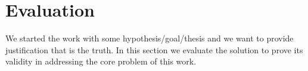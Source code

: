 \section{Evaluation}

  We started the work with some hypothesis/goal/thesis and
  we want to provide justification that is the truth.
  In this section we evaluate the solution to prove its
  validity in addressing the core problem of this work.

